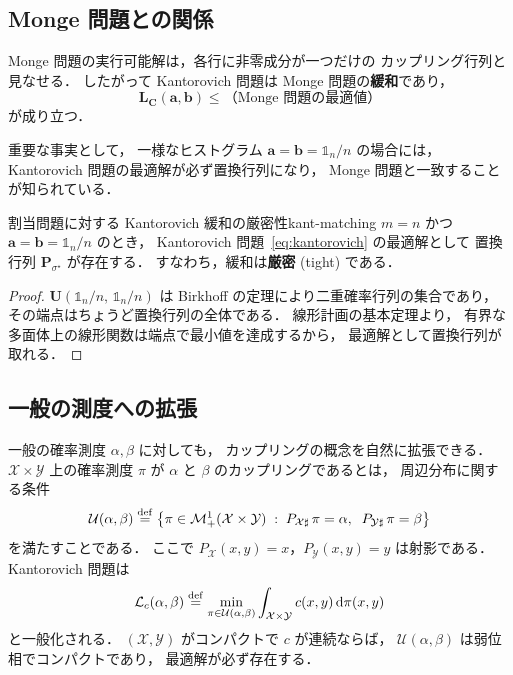 \subsection{Monge 問題との関係}\label{subsec:monge-kant-relation}

Monge 問題の実行可能解は，各行に非零成分が一つだけの
カップリング行列と見なせる．
したがって Kantorovich 問題は Monge 問題の\textbf{緩和}であり，
\[
  \mathbf{L_C}(\mathbf{a}, \mathbf{b})
  \leq \text{（Monge 問題の最適値）}
\]
が成り立つ．

重要な事実として，
一様なヒストグラム $\mathbf{a} = \mathbf{b} = \mathbb{1}_n / n$
の場合には，Kantorovich 問題の最適解が必ず置換行列になり，
Monge 問題と一致することが知られている．

\begin{proposition}{割当問題に対する Kantorovich 緩和の厳密性}{kant-matching}
$m = n$ かつ $\mathbf{a} = \mathbf{b} = \mathbb{1}_n / n$ のとき，
Kantorovich 問題~\eqref{eq:kantorovich} の最適解として
置換行列 $\mathbf{P}_{\sigma^\star}$ が存在する．
すなわち，緩和は\textbf{厳密} (tight) である．
\end{proposition}

\begin{proof}
$\mathbf{U}(\mathbb{1}_n/n,\, \mathbb{1}_n/n)$ は
Birkhoff の定理により二重確率行列の集合であり，
その端点はちょうど置換行列の全体である．
線形計画の基本定理より，
有界な多面体上の線形関数は端点で最小値を達成するから，
最適解として置換行列が取れる．
\end{proof}

\subsection{一般の測度への拡張}\label{subsec:kantorovich-general}

一般の確率測度 $\alpha, \beta$ に対しても，
カップリングの概念を自然に拡張できる．
$\mathcal{X} \times \mathcal{Y}$ 上の確率測度 $\pi$ が
$\alpha$ と $\beta$ のカップリングであるとは，
周辺分布に関する条件
\begin{equation}\label{eq:coupling-general}
  \mathcal{U}(\alpha, \beta) \overset{\mathrm{def}}{=}
  \left\{
    \pi \in \mathcal{M}^1_+(\mathcal{X} \times \mathcal{Y})
    \;:\;
    P_{\mathcal{X}\sharp}\, \pi = \alpha,\;\;
    P_{\mathcal{Y}\sharp}\, \pi = \beta
  \right\}
\end{equation}
を満たすことである．
ここで $P_\mathcal{X}(x,y) = x$，$P_\mathcal{Y}(x,y) = y$
は射影である．
Kantorovich 問題は
\begin{equation}\label{eq:kantorovich-general}
  \mathcal{L}_c(\alpha, \beta)
  \overset{\mathrm{def}}{=} \min_{\pi \in \mathcal{U}(\alpha, \beta)}
  \int_{\mathcal{X} \times \mathcal{Y}} c(x, y)\, \mathrm{d}\pi(x, y)
\end{equation}
と一般化される．
$(\mathcal{X}, \mathcal{Y})$ がコンパクトで $c$ が連続ならば，
$\mathcal{U}(\alpha, \beta)$ は弱位相でコンパクトであり，
最適解が必ず存在する．

